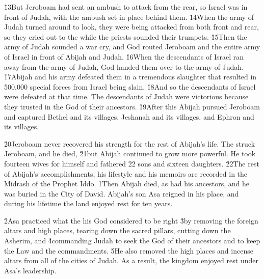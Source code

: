 \v{13}But Jeroboam had sent an ambush to attack from the rear, so Israel was in front of Judah, with the ambush set in place behind them. \v{14}When the army of Judah turned around to look, they were being attacked from both front and rear, so they cried out to the  while the priests sounded their trumpets. \v{15}Then the army of Judah sounded a war cry, and God routed Jeroboam and the entire army of Israel in front of Abijah and Judah. \v{16}When the descendants of Israel ran away from the army of Judah, God handed them over to the army of Judah. \v{17}Abijah and his army defeated them in a tremendous slaughter that resulted in 500,000 special forces from Israel being slain. \v{18}And so the descendants of Israel were defeated at that time. The descendants of Judah were victorious because they trusted in the  God of their ancestors. \v{19}After this Abijah pursued Jeroboam and captured Bethel and its villages, Jeshanah and its villages, and Ephron and its villages.

\v{20}Jeroboam never recovered his strength for the rest of Abijah's life. The  struck Jeroboam, and he died, \v{21}but Abijah continued to grow more powerful. He took fourteen wives for himself and fathered 22 sons and sixteen daughters. \v{22}The rest of Abijah's accomplishments, his lifestyle and his memoirs are recorded in the Midrash of the Prophet Iddo.
\v{1}Then Abijah died, as had his ancestors, and he was buried in the City of David. Abijah's son Asa reigned in his place, and during his lifetime the land enjoyed rest for ten years.

\v{2}Asa practiced what the  his God considered to be right \v{3}by removing the foreign altars and high places, tearing down the sacred pillars, cutting down the Asherim, and \v{4}commanding Judah to seek the  God of their ancestors and to keep the Law and the commandments. \v{5}He also removed the high places and incense altars from all of the cities of Judah. As a result, the kingdom enjoyed rest under Asa's leadership.

